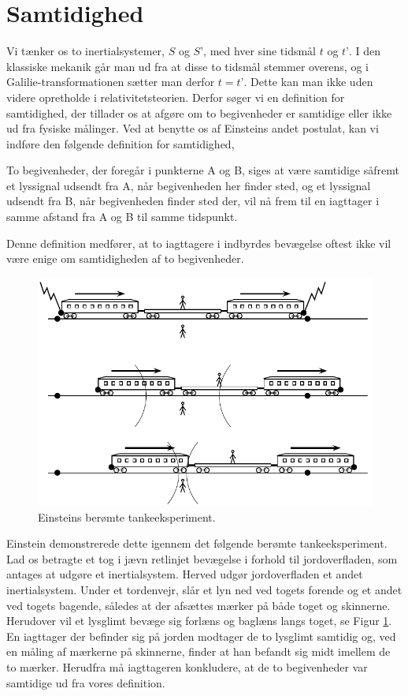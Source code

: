 \section{Samtidighed}

Vi tænker os to inertialsystemer, $S$ og $S’$, med hver sine tidsmål $t$ og $t’$. I den klassiske mekanik går man ud fra at disse to tidsmål stemmer overens, og i Galilie-transformationen sætter man derfor $t = t’$. Dette kan man ikke uden videre opretholde i relativitetsteorien. Derfor søger vi en definition for samtidighed, der tillader os at afgøre om to begivenheder er samtidige eller ikke ud fra fysiske målinger. Ved at benytte os af Einsteins andet postulat, kan vi indføre den følgende definition for samtidighed, 

\begin{framed}
	\centering
	To begivenheder, der foregår i punkterne A og B, siges at være samtidige såfremt et lyssignal udsendt fra A, når begivenheden her finder sted, og et lyssignal udsendt fra B, når begivenheden finder sted der, vil nå frem til en iagttager i samme afstand fra A og B til samme tidspunkt.
\end{framed}

Denne definition medfører, at to iagttagere i indbyrdes bevægelse oftest ikke vil være enige om samtidigheden af to begivenheder.

\begin{figure}[h!]
	\centering
	\includegraphics[scale=1]{Relativitetsteori/Tog.pdf}
	\caption{Einsteins berømte tankeeksperiment.}
	\label{sr.tog}
\end{figure}

Einstein demonstrerede dette igennem det følgende berømte tankeeksperiment. Lad os betragte et tog i jævn retlinjet bevægelse i forhold til jordoverfladen, som antages at udgøre et inertialsystem. Herved udgør jordoverfladen et andet inertialsystem. Under et tordenvejr, slår et lyn ned ved togets forende og et andet ved togets bagende, således at der afsættes mærker på både toget og skinnerne. Herudover vil et lysglimt bevæge sig forlæns og baglæns langs toget, se Figur \ref{sr.tog}. En iagttager der befinder sig på jorden modtager de to lysglimt samtidig og, ved en måling af mærkerne på skinnerne, finder at han befandt sig midt imellem de to mærker. Herudfra må iagttageren konkludere, at de to begivenheder var samtidige ud fra vores definition.

